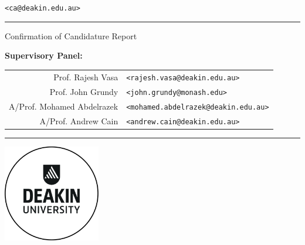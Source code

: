 \vspace*{\fill}
\thispagestyle{empty}
\linespread{1.2}

\centering

\Large
\textbf{\thetitle{}}
\vspace{0.9 cm}


\theauthor{}\\
\normalsize \theauthorspostnominals{}\\
\texttt{<ca@deakin.edu.au>}
\vspace{0.75 cm}

%
\scshape\large
\hrule
\bigskip
Confirmation of Candidature Report

\small
\medskip
\upshape
\textbf{Supervisory Panel:}\medskip

\begin{tabular}{r l}
Prof. Rajesh Vasa & \texttt{<rajesh.vasa@deakin.edu.au>}\\
Prof. John Grundy & \texttt{<john.grundy@monash.edu>}\\
A/Prof. Mohamed Abdelrazek & \texttt{<mohamed.abdelrazek@deakin.edu.au>}\\
A/Prof. Andrew Cain & \texttt{<andrew.cain@deakin.edu.au>}
\end{tabular}
\bigskip
\hrule

\vspace{2 cm}
\includegraphics[width=120pt]{frontmatter/figures/deakin}
\vspace{2 cm}

\upshape\large
\thedepartment{}\\
\theinstitution{}\\
\thelocation

\vspace{1cm}
\thedate{}
\vspace*{\fill}

\justify
\normalsize
\restoregeometry